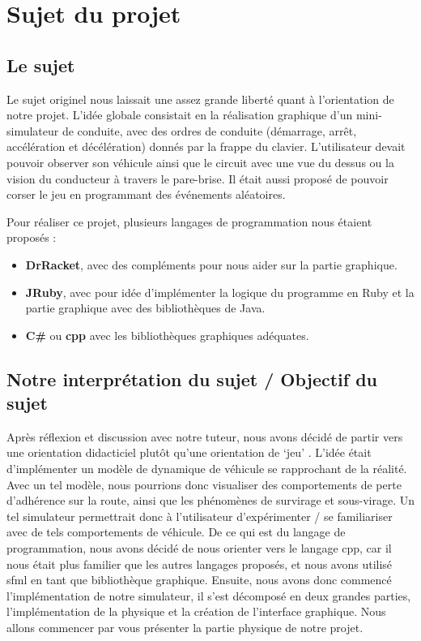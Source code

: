 \section{Sujet du projet}\label{sec:sujet-du-projet}
\subsection{Le sujet}\label{subsec:le-sujet}
Le sujet originel nous laissait une assez grande liberté quant à l'orientation de notre projet.
L'idée globale consistait en la réalisation graphique d'un mini-simulateur de conduite, avec des ordres de conduite (démarrage, arrêt, accélération et décélération) donnés par la frappe du clavier.
L'utilisateur devait pouvoir observer son véhicule ainsi que le circuit avec une vue du dessus ou la vision du conducteur à travers le pare-brise.
Il était aussi proposé de pouvoir \og corser\fg{} le jeu en programmant des événements aléatoires.

Pour réaliser ce projet, plusieurs langages de programmation nous étaient proposés :
\begin{itemize}
    \item \textbf{DrRacket}, avec des compléments pour nous aider sur la partie graphique.
    \item \textbf{JRuby}, avec pour idée d'implémenter la logique du programme en Ruby et la partie graphique avec des bibliothèques de Java.
    \item \textbf{C\#} ou \textbf{\gls{cpp}} avec les bibliothèques graphiques adéquates.
\end{itemize}


\subsection{Notre interprétation du sujet / Objectif du sujet}\label{subsec:notre-interpretation-du-sujet-/-objectif-du-sujet}
Après réflexion et discussion avec notre tuteur, nous avons décidé de partir vers une orientation didacticiel plutôt qu'une \og orientation de `jeu' \fg{}.
L'idée était d'implémenter un modèle de dynamique de véhicule se rapprochant de la réalité.
Avec un tel modèle, nous pourrions donc visualiser des comportements de perte d'adhérence sur la route, ainsi que les phénomènes de survirage et sous-virage.
Un tel simulateur permettrait donc à l'utilisateur d'expérimenter / se familiariser avec de tels comportements de véhicule.
De ce qui est du langage de programmation, nous avons décidé de nous orienter vers le langage \gls{cpp}, car il nous était plus familier que les autres langages proposés, et nous avons utilisé \gls{sfml} en tant que bibliothèque graphique.
Ensuite, nous avons donc commencé l'implémentation de notre simulateur, il s'est décomposé en deux grandes parties, l'implémentation de la physique et la création de l'interface graphique.
Nous allons commencer par vous présenter la partie physique de notre projet.

\newpage